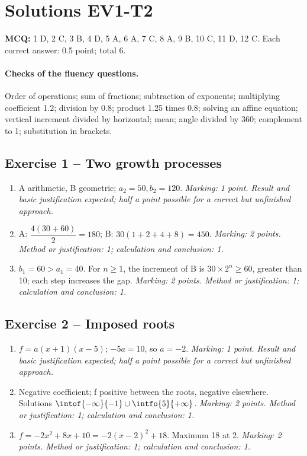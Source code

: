 \mxnewpage\section*{Solutions EV1-T2}\label{EV1-T2-CORR}
\textbf{MCQ:} 1 D, 2 C, 3 B, 4 D, 5 A, 6 A, 7 C, 8 A, 9 B, 10 C, 11 D, 12 C. Each correct answer: \num{0,5} point; total 6.
\paragraph{Checks of the fluency questions.} Order of operations; sum of fractions; subtraction of exponents; multiplying coefficient \num{1,2}; division by \num{0,8}; product \num{1,25} times \num{0,8}; solving an affine equation; vertical increment divided by horizontal; mean; angle divided by 360; complement to 1; substitution in brackets.
\subsection*{Exercise 1 -- Two growth processes}
\begin{enumerate}
\item A arithmetic, B geometric; $a_2=50,b_2=120$. \textit{Marking: 1 point. Result and basic justification expected; half a point possible for a correct but unfinished approach.}
\item A: $\dfrac{4(30+60)}{2}=180$; B: $30(1+2+4+8)=450$. \textit{Marking: 2 points. Method or justification: 1; calculation and conclusion: 1.}
\item $b_1=60>a_1=40$. For $n\geq1$, the increment of B is $30\times2^n\geq60$, greater than 10; each step increases the gap. \textit{Marking: 2 points. Method or justification: 1; calculation and conclusion: 1.}
\end{enumerate}
\subsection*{Exercise 2 -- Imposed roots}
\begin{enumerate}
\item $f=a(x+1)(x-5)$; $-5a=10$, so $a=-2$. \textit{Marking: 1 point. Result and basic justification expected; half a point possible for a correct but unfinished approach.}
\item Negative coefficient; f positive between the roots, negative elsewhere. Solutions $\intof{-\infty}{-1}\cup\intfo{5}{+\infty}$. \textit{Marking: 2 points. Method or justification: 1; calculation and conclusion: 1.}
\item $f=-2x^2+8x+10=-2(x-2)^2+18$. Maximum 18 at 2. \textit{Marking: 2 points. Method or justification: 1; calculation and conclusion: 1.}
\end{enumerate}
